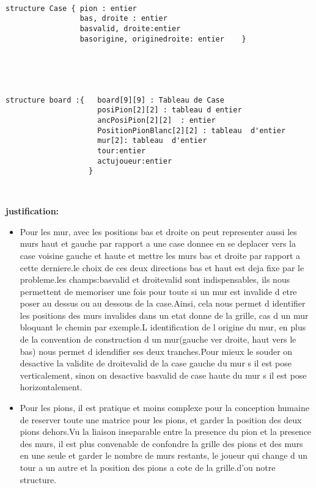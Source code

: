 \documentclass[a4paper, draft]{article}
\begin{document}
\begin{verbatim}
            
structure Case { pion : entier 
                 bas, droite : entier
                 basvalid, droite:entier
                 basorigine, originedroite: entier    }                   
                                                                
                                                  
                     
                      

structure board :{   board[9][9] : Tableau de Case
                     posiPion[2][2] : tableau d entier
                     ancPosiPion[2][2]  : entier
                     PositionPionBlanc[2][2] : tableau  d'entier
                     mur[2]: tableau  d'entier  
                     tour:entier    
                     actujoueur:entier   
                   }



\end{verbatim}
\textbf{justification:}\\
\begin{itemize}
\item
Pour les mur, avec les positions bas et droite on peut representer aussi les murs haut et gauche par rapport a une case donnee en se deplacer vers la case voisine gauche et haute et mettre les murs bas et droite par rapport a cette derniere.le choix de ces deux directions bas et haut est deja fixe par le probleme.les champs:basvalid et droitevalid sont indispensables, ils nous permettent de memoriser une fois pour toute si un mur est invalide d etre poser au dessus ou au dessous de la case.Ainsi, cela nous permet d identifier les positions des murs invalides dans un etat donne de la grille, cas d un mur bloquant le chemin par exemple.L identification de l origine du mur, en plus de la convention de construction d un mur(gauche ver droite, haut vers le bas) nous permet d idendifier ses deux tranches.Pour mieux le souder on desactive la validite de droitevalid de la case gauche du mur s il est pose verticalement, sinon on desactive basvalid de case haute du mur s il est pose horizontalement.\\
\item
Pour les pions, il est pratique et moins complexe pour la conception humaine de reserver toute une matrice pour les pions, et garder la position des deux pions dehors.Vu la liaison inseparable entre la presence du pion et la presence des murs, il est plus convenable de confondre la grille des pions et des murs en une seule et garder le nombre de murs restants, le joueur qui change d un tour a un autre et la position des pions a cote de la grille.d'ou notre structure.\\

\end{itemize}        
\end{document}
